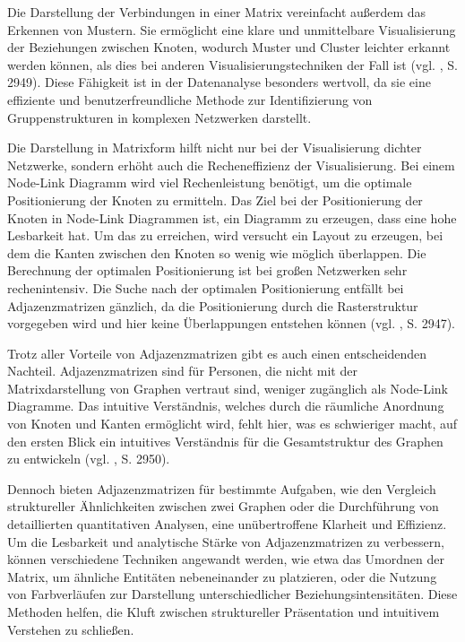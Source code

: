Die Darstellung der Verbindungen in einer Matrix vereinfacht außerdem das Erkennen von Mustern. Sie ermöglicht eine klare und unmittelbare Visualisierung der Beziehungen zwischen Knoten, wodurch Muster und Cluster leichter erkannt werden können, als dies bei anderen Visualisierungstechniken der Fall ist (vgl. \cite{adjacencyOrNode:Okoe}, S. 2949). Diese Fähigkeit ist in der Datenanalyse besonders wertvoll, da sie eine effiziente und benutzerfreundliche Methode zur Identifizierung von Gruppenstrukturen in komplexen Netzwerken darstellt.

Die Darstellung in Matrixform hilft nicht nur bei der Visualisierung dichter Netzwerke, sondern erhöht auch die Recheneffizienz der Visualisierung. Bei einem Node-Link Diagramm wird viel Rechenleistung benötigt, um die optimale Positionierung der Knoten zu ermitteln. Das Ziel bei der Positionierung der Knoten in Node-Link Diagrammen ist, ein Diagramm zu erzeugen, dass eine hohe Lesbarkeit hat. Um das zu erreichen, wird versucht ein Layout zu erzeugen, bei dem die Kanten zwischen den Knoten so wenig wie möglich überlappen. Die Berechnung der optimalen Positionierung ist bei großen Netzwerken sehr rechenintensiv. Die Suche nach der optimalen Positionierung entfällt bei Adjazenzmatrizen gänzlich, da die Positionierung durch die Rasterstruktur vorgegeben wird und hier keine Überlappungen entstehen können (vgl. \cite{adjacencyOrNode:Okoe}, S. 2947).

Trotz aller Vorteile von Adjazenzmatrizen gibt es auch einen entscheidenden Nachteil. Adjazenzmatrizen sind für Personen, die nicht mit der Matrixdarstellung von Graphen vertraut sind, weniger zugänglich als Node-Link Diagramme. Das intuitive Verständnis, welches durch die räumliche Anordnung von Knoten und Kanten ermöglicht wird, fehlt hier, was es schwieriger macht, auf den ersten Blick ein intuitives Verständnis für die Gesamtstruktur des Graphen zu entwickeln (vgl. \cite{adjacencyOrNode:Okoe}, S. 2950).

Dennoch bieten Adjazenzmatrizen für bestimmte Aufgaben, wie den Vergleich struktureller Ähnlichkeiten zwischen zwei Graphen oder die Durchführung von detaillierten quantitativen Analysen, eine unübertroffene Klarheit und Effizienz. Um die Lesbarkeit und analytische Stärke von Adjazenzmatrizen zu verbessern, können verschiedene Techniken angewandt werden, wie etwa das Umordnen der Matrix, um ähnliche Entitäten nebeneinander zu platzieren, oder die Nutzung von Farbverläufen zur Darstellung unterschiedlicher Beziehungsintensitäten. Diese Methoden helfen, die Kluft zwischen struktureller Präsentation und intuitivem Verstehen zu schließen.

